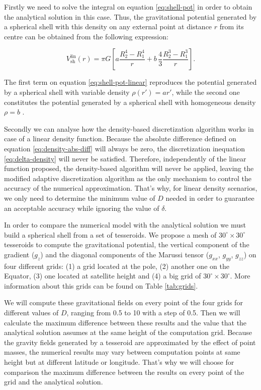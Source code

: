 \documentclass[extra]{gji}
\begin{document}
Firstly we need to solve the integral on equation \ref{eq:shell-pot} in 
order to obtain the analytical solution in this case.
Thus, the gravitational potential generated by a spherical shell with this 
density on any external point at distance $r$ from its centre can be 
obtained from the following expression:

\begin{equation}
    V_\text{sh}^\text{lin}(r) = \pi G \left[ 
    a \frac{R_2^4 - R_1^4}{r} +
    b \,\frac{4}{3} \frac{R_2^3 - R_1^3}{r} \right].
    \label{eq:shell-pot-linear}
\end{equation}

\noindent The first term on equation \ref{eq:shell-pot-linear} 
reproduces the potential generated by a spherical shell with variable 
density $\rho(r') = ar'$, while the second one constitutes the 
potential generated by a spherical shell with homogeneous density $\rho 
= b$ \citep{Mikuska2006,Grombein2013}.

Secondly we can analyse how the density-based discretization algorithm 
works in case of a linear density function.
Because the absolute difference defined on equation 
\ref{eq:density-abs-diff} will always be zero, the discretization 
inequation \ref{eq:delta-density} will never be satisfied.
Therefore, independently of the linear function proposed, the 
density-based algorithm will never be applied, leaving the modified 
adaptive discretization algorithm as the only mechanism to control the 
accuracy of the numerical approximation.
That's why, for linear density scenarios, we only need to determine 
the minimum value of $D$ needed in order to guarantee an acceptable 
accuracy while ignoring the value of $\delta$.

In order to compare the numerical model with the analytical solution we 
must build a spherical shell from a set of tesseroids.
We propose a mesh of $30^\circ \times 30^\circ$ tesseroids to compute 
the gravitational potential, the vertical component of the gradient 
($g_z$) and the diagonal components of the Marussi tensor ($g_{xx}$, 
$g_{yy}$, $g_{zz}$) on four different grids: (1) a grid located at the 
pole, (2) another one on the Equator, (3) one located at satellite 
height and (4) a big grid of $30^\circ \times 30^\circ$.
More information about this grids can be found on Table 
\ref{tab:grids}.

We will compute these gravitational fields on every point of the four 
grids for different values of $D$, ranging from 0.5 to 10 with a step 
of 0.5.
Then we will calculate the maximum difference between these results and the 
value that the analytical solution assumes at the same height of the 
computation grid.
Because the gravity fields generated by a tesseroid are approximated by 
the effect of point masses, the numerical results may vary between 
computation points at same height but at different latitude or 
longitude.
That's why we will choose for comparison the maximum difference between the 
results on every point of the grid and the analytical solution.
\end{document}
